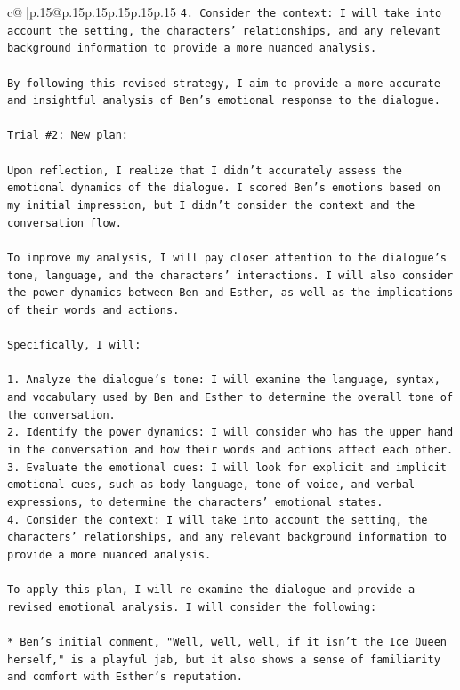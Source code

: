 \documentclass{article}
\begin{document}
{\begin{supertabular}{c@{$\;$}|p{.15\linewidth}@{}p{.15\linewidth}p{.15\linewidth}p{.15\linewidth}p{.15\linewidth}p{.15\linewidth}}
{{{\texttt{4. Consider the context: I will take into account the setting, the characters' relationships, and any relevant background information to provide a more nuanced analysis.} \\
\\ 
\texttt{By following this revised strategy, I aim to provide a more accurate and insightful analysis of Ben's emotional response to the dialogue.} \\
\\ 
\texttt{Trial \#2: New plan: } \\
\\ 
\texttt{Upon reflection, I realize that I didn't accurately assess the emotional dynamics of the dialogue. I scored Ben's emotions based on my initial impression, but I didn't consider the context and the conversation flow. } \\
\\ 
\texttt{To improve my analysis, I will pay closer attention to the dialogue's tone, language, and the characters' interactions. I will also consider the power dynamics between Ben and Esther, as well as the implications of their words and actions.} \\
\\ 
\texttt{Specifically, I will:} \\
\\ 
\texttt{1. Analyze the dialogue's tone: I will examine the language, syntax, and vocabulary used by Ben and Esther to determine the overall tone of the conversation.} \\
\texttt{2. Identify the power dynamics: I will consider who has the upper hand in the conversation and how their words and actions affect each other.} \\
\texttt{3. Evaluate the emotional cues: I will look for explicit and implicit emotional cues, such as body language, tone of voice, and verbal expressions, to determine the characters' emotional states.} \\
\texttt{4. Consider the context: I will take into account the setting, the characters' relationships, and any relevant background information to provide a more nuanced analysis.} \\
\\ 
\texttt{To apply this plan, I will re{-}examine the dialogue and provide a revised emotional analysis. I will consider the following:} \\
\\ 
\texttt{* Ben's initial comment, "Well, well, well, if it isn't the Ice Queen herself," is a playful jab, but it also shows a sense of familiarity and comfort with Esther's reputation.} \\
}}}
\end{supertabular}}
\end{document}
